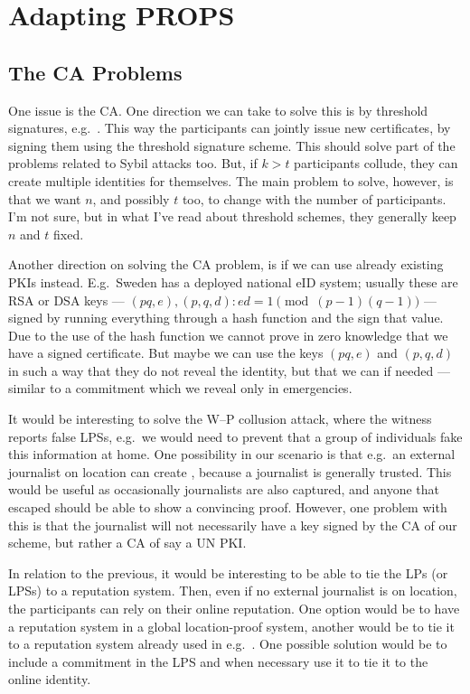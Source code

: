 \mode*

\section{Adapting PROPS}
\label{AdaptingPROPS}

\subsection{The \acs*{CA} Problems}

One issue is the \ac{CA}.
One direction we can take to solve this is by threshold signatures, e.g.\ 
\cite{FSThresholdSignatures}.
This way the participants can jointly issue new certificates, by signing them 
using the threshold signature scheme.
This should solve part of the problems related to Sybil attacks too.
But, if \(k > t\) participants collude, they can create multiple identities for 
themselves.
The main problem to solve, however, is that we want \(n\), and possibly \(t\) 
too, to change with the number of participants.
I'm not sure, but in what I've read about threshold schemes, they generally 
keep \(n\) and \(t\) fixed.

Another direction on solving the \ac{CA} problem, is if we can use already 
existing \acp{PKI} instead.
E.g.\ Sweden has a deployed national \ac{eID} system; usually these are RSA or 
DSA keys --- \((pq, e), (p, q, d): ed = 1\pmod{(p-1)(q-1)}\) --- signed by 
running everything through a hash function and the sign that value.
Due to the use of the hash function we cannot prove in zero knowledge that we 
have a signed certificate.
But maybe we can use the keys \((pq, e)\) and \((p, q, d)\) in such a way that 
they do not reveal the identity, but that we can if needed --- similar to 
a commitment which we reveal only in emergencies.

It would be interesting to solve the W--P collusion attack, where the witness 
reports false \acp{LPS}, e.g.\ we would need to prevent that a group of 
individuals fake this information at home.
One possibility in our scenario is that e.g.\ an external journalist on 
location can create \iac{LPS}, because a journalist is generally trusted.
This would be useful as occasionally journalists are also captured, and anyone 
that escaped should be able to show a convincing proof.
However, one problem with this is that the journalist will not necessarily have 
a key signed by the \ac{CA} of our scheme, but rather a \ac{CA} of say a UN 
\ac{PKI}.

In relation to the previous, it would be interesting to be able to tie the 
\acp{LP} (or \acp{LPS}) to a reputation system.
Then, even if no external journalist is on location, the participants can rely 
on their online reputation.
One option would be to have a reputation system in a global location-proof 
system, another would be to tie it to a reputation system already used in e.g.\ 
.
One possible solution would be to include a commitment in the \ac{LPS} and when 
necessary use it to tie it to the online identity.

